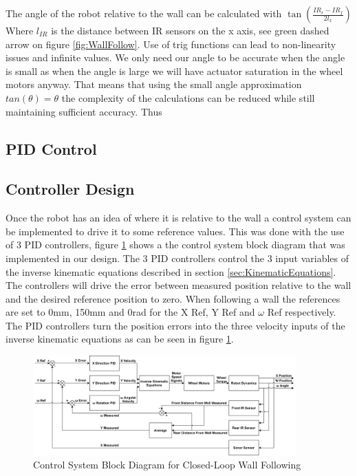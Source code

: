 \documentclass[11pt]{article}
\begin{document}
The angle of the robot relative to the wall can be calculated with $\tan(\frac{IR_{r} - IR_{f}}{2l_{x}})$ Where $l_{IR}$ is the distance between IR sensors on the x axis, see green dashed arrow on figure \ref{fig:WallFollow}. Use of trig functions can lead to non-linearity issues and infinite values. We only need our angle to be accurate when the angle is small as when the angle is large we will have actuator saturation in the wheel motors anyway. That means that using the small angle approximation $tan(\theta) = \theta$ the complexity of the calculations can be reduced while still maintaining sufficient accuracy. Thus 

\subsection{PID Control}

\subsection{Controller Design}
\par Once the robot has an idea of where it is relative to the wall a control system can be implemented to drive it to some reference values. This was done with the use of 3 PID controllers, figure \ref{fig:PIDControl} shows a the control system block diagram that was implemented in our design. The 3 PID controllers control the 3 input variables of the inverse kinematic equations described in section \ref{sec:KinematicEquations}. The controllers will drive the error between measured position relative to the wall and the desired reference position to zero. When following a wall the references are set to 0mm, 150mm and 0rad for the X Ref, Y Ref and $\omega$ Ref respectively. The PID controllers turn the position errors into the three velocity inputs of the inverse kinematic equations as can be seen in figure \ref{fig:PIDControl}.

\begin{figure}[htbp]
    \centering
    \includegraphics[width=0.9\textwidth]{ControlDiagram.png}
    \caption{Control System Block Diagram for Closed-Loop Wall Following}
    \label{fig:PIDControl}
\end{figure}
\end{document}
